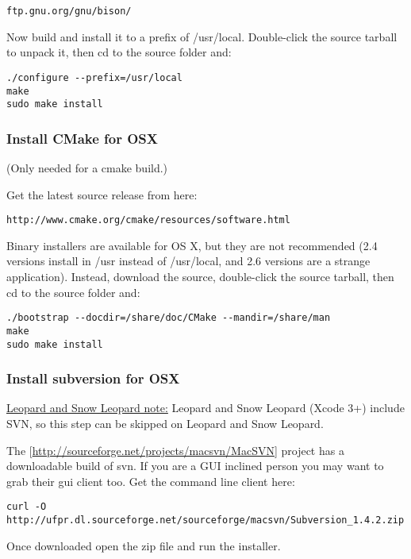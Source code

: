 \begin{verbatim}
ftp.gnu.org/gnu/bison/
\end{verbatim}

Now build and install it to a prefix of /usr/local. Double-click the source
tarball to unpack it, then cd to the source folder and:

\begin{verbatim}
./configure --prefix=/usr/local 
make
sudo make install 
\end{verbatim}

\hypertarget{toc33}{}
\subsubsection{Install CMake for OSX}
(Only needed for a cmake build.)

Get the latest source release from here:

\begin{verbatim}
http://www.cmake.org/cmake/resources/software.html
\end{verbatim}

Binary installers are available for OS X, but they are not recommended
(2.4 versions install in /usr instead of /usr/local, and 2.6 versions are a
strange application). Instead, download the source, double-click the source tarball,
then cd to the source folder and:

\begin{verbatim}
./bootstrap --docdir=/share/doc/CMake --mandir=/share/man
make
sudo make install
\end{verbatim}

\hypertarget{toc34}{}
\subsubsection{Install subversion for OSX}
\underline{Leopard and Snow Leopard note:} Leopard and Snow Leopard (Xcode 3+)
include SVN, so this step can be skipped on Leopard and Snow Leopard.

The [\url{http://sourceforge.net/projects/macsvn/MacSVN}] project has a downloadable
build of svn. If you are a GUI inclined person you may want to grab their gui
client too. Get the command line client here:

\begin{verbatim}
curl -O http://ufpr.dl.sourceforge.net/sourceforge/macsvn/Subversion_1.4.2.zip 
\end{verbatim}

Once downloaded open the zip file and run the installer.

